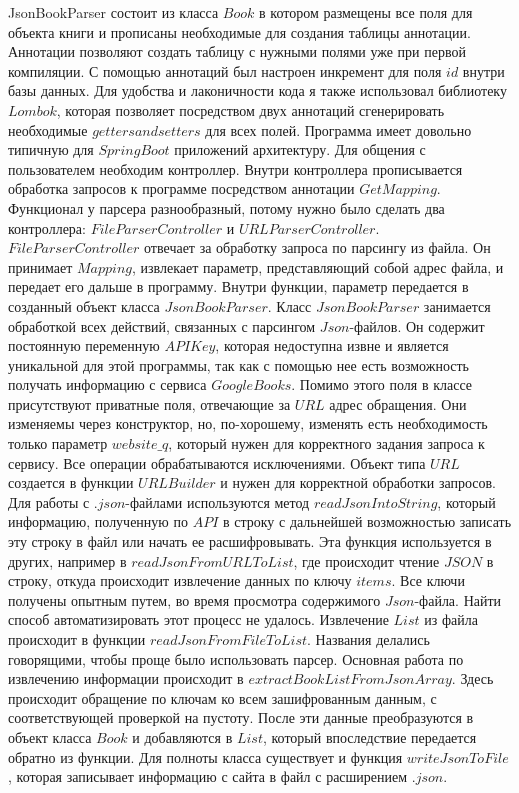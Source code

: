JsonBookParser состоит из класса $Book$ в котором размещены все поля для объекта книги и прописаны необходимые для создания таблицы аннотации. Аннотации позволяют создать таблицу с нужными полями уже при первой компиляции. С помощью аннотаций был настроен инкремент для поля $id$ внутри базы данных. Для удобства и лаконичности кода я также использовал библиотеку $Lombok$, которая позволяет посредством двух аннотаций сгенерировать необходимые $getters and setters$ для всех полей. Программа имеет довольно типичную для $Spring Boot$ приложений архитектуру. Для общения с пользователем необходим контроллер. Внутри контроллера прописывается обработка запросов к программе посредством аннотации $GetMapping$. Функционал у парсера разнообразный, потому нужно было сделать два контроллера: $FileParserController$ и $URLParserController$. $FileParserController$ отвечает за обработку запроса по парсингу из файла. Он принимает $Mapping$, извлекает параметр, представляющий собой адрес файла, и передает его дальше в программу. Внутри функции, параметр передается в созданный объект класса $JsonBookParser$.
\newline Класс $JsonBookParser$ занимается обработкой всех действий, связанных с парсингом $Json$-файлов. Он содержит постоянную переменную $APIKey$, которая недоступна извне и является уникальной для этой программы, так как с помощью нее есть возможность получать информацию с сервиса $Google Books$. Помимо этого поля в классе присутствуют приватные поля, отвечающие за $URL$ адрес обращения. Они изменяемы через конструктор, но, по-хорошему, изменять есть необходимость только параметр $website\_q$, который нужен для корректного задания запроса к сервису. Все операции обрабатываются исключениями. Объект типа $URL$ создается в функции $URLBuilder$ и нужен для корректной обработки запросов. Для работы с $.json$-файлами используются метод $readJsonIntoString$, который информацию, полученную по $API$ в строку с дальнейшей возможностью записать эту строку в файл или начать ее расшифровывать. Эта функция используется в других, например в $readJsonFromURLToList$, где происходит чтение $JSON$ в строку, откуда происходит извлечение данных по ключу $items$. Все ключи получены опытным путем, во время просмотра содержимого $Json$-файла. Найти способ автоматизировать этот процесс не удалось. Извлечение $List$ из файла происходит в функции $readJsonFromFileToList$. Названия делались говорящими, чтобы проще было использовать парсер. Основная работа по извлечению информации происходит в $extractBookListFromJsonArray$. Здесь происходит обращение по ключам ко всем зашифрованным данным, с соответствующей проверкой на пустоту. После эти данные преобразуются в объект класса $Book$ и добавляются в $List$, который впоследствие передается обратно из функции. Для полноты класса существует и функция $writeJsonToFile$, которая записывает информацию с сайта в файл с расширением $.json$.
